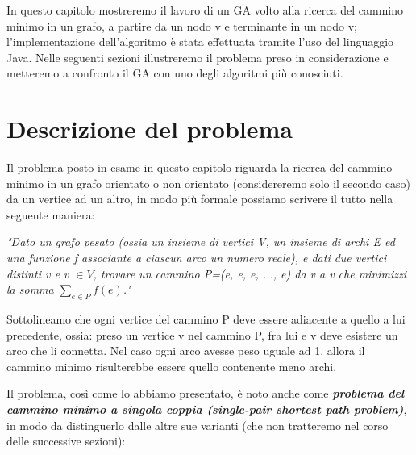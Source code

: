 
In questo capitolo mostreremo il lavoro di un GA volto alla ricerca del cammino minimo in un grafo, a partire da un nodo v e terminante in un nodo v; l'implementazione dell'algoritmo \`e stata effettuata tramite l'uso del linguaggio Java. Nelle seguenti sezioni illustreremo il problema preso in considerazione e metteremo a confronto il GA con uno degli algoritmi pi\`u conosciuti.
\section{Descrizione del problema}
Il problema posto in esame in questo capitolo riguarda la ricerca del cammino minimo in un grafo orientato o non orientato (considereremo solo il secondo caso) da un vertice ad un altro, in modo pi\`u formale possiamo scrivere il tutto nella seguente maniera:
\vspace{3mm}

\textit{"Dato un grafo pesato (ossia un insieme di vertici V, un insieme di archi E ed una funzione f associante a ciascun arco un numero reale),  e dati due vertici distinti v e v $\in V$, trovare un cammino P=(e, e, e, ..., e) da v a v che minimizzi la somma $\sum_{e\in P} f(e)$."}
\vspace{3mm}

Sottolineamo che ogni vertice del cammino P deve essere adiacente a quello a lui precedente, ossia: preso un vertice v nel cammino P, fra lui e v deve esistere un arco che li connetta. Nel caso ogni arco avesse peso uguale ad 1, allora il cammino minimo risulterebbe essere quello contenente meno archi.
\vspace{3mm}

Il problema, cos\`i come lo abbiamo presentato, \`e noto anche come \textit{\textbf{problema del cammino minimo a singola coppia (single-pair shortest path problem)}}, in modo da distinguerlo dalle altre sue varianti (che non tratteremo nel corso delle successive sezioni):


